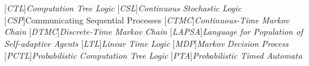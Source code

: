     \chapter*{\acronymname}
    \begin{acronym}[LAPSA]
		[\emph{CTL}]{\emph{Computation Tree Logic}}
		[\emph{CSL}]{\emph{Continuous Stochastic Logic}}
		[\emph{CSP}]{Communicating Sequential Processes}
		[\emph{CTMC}]{\emph{Continuous-Time Markov Chain}}
		[\emph{DTMC}]{\emph{Discrete-Time Markov Chain}}
		[\emph{LAPSA}]{\emph{Language for Population of Self-adaptive Agents}}
		[\emph{LTL}]{\emph{Linear Time Logic}}
		[\emph{MDP}]{\emph{Markov Decision Process}}		
		[\emph{PCTL}]{\emph{Probabilistic Computation Tree Logic}}
		[\emph{PTA}]{\emph{Probabilistic Timed Automata}}
    \end{acronym}
\endgroup

\cleardoublepage